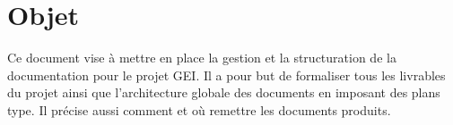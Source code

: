 \section{Objet}

Ce document vise à mettre en place la gestion et la structuration de la 
documentation pour le projet GEI.
Il a pour but de formaliser tous les livrables du projet ainsi que 
l'architecture globale des documents en imposant des plans type. Il précise
aussi comment et où remettre les documents produits.

